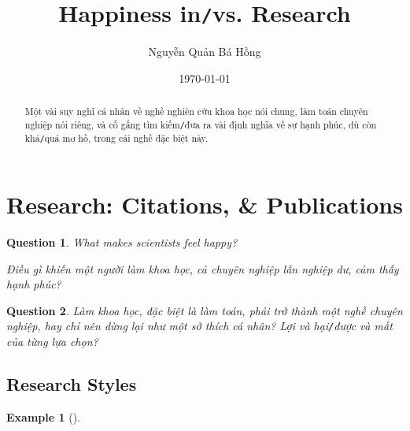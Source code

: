 \documentclass{article}
\title{Happiness in\texttt{/}vs. Research}
\author{Nguyễn Quản Bá Hồng}
\date{\today}
\numberwithin{equation}{section}
\newtheorem{example}{Example}[section]
\newtheorem{ques}{Question}[section]
\begin{document}
\maketitle
\begin{abstract}
	Một vài suy nghĩ cá nhân về nghề nghiên cứu khoa học nói chung, làm toán chuyên nghiệp nói riêng, và cố gắng tìm kiếm\texttt{/}đưa ra vài định nghĩa về sự hạnh phúc, dù còn khá\texttt{/}quá mơ hồ, trong cái nghề đặc biệt này.
\end{abstract}
\tableofcontents


\section{Research: Citations, \& Publications}
\begin{ques}
	What makes scientists feel happy?
	
	Điều gì khiến một người làm khoa học, cả chuyên nghiệp lẫn nghiệp dư, cảm thấy hạnh phúc?
\end{ques}

\begin{ques}
	Làm khoa học, đặc biệt là làm toán, phải trở thành một nghề chuyên nghiệp, hay chỉ nên dừng lại như một sở thích cá nhân? Lợi và hại\texttt{/}được và mất của từng lựa chọn?
\end{ques}

\subsection{Research Styles}
\begin{example}[\cite{VNE/PHH}]
	
\end{example}
\end{document}
